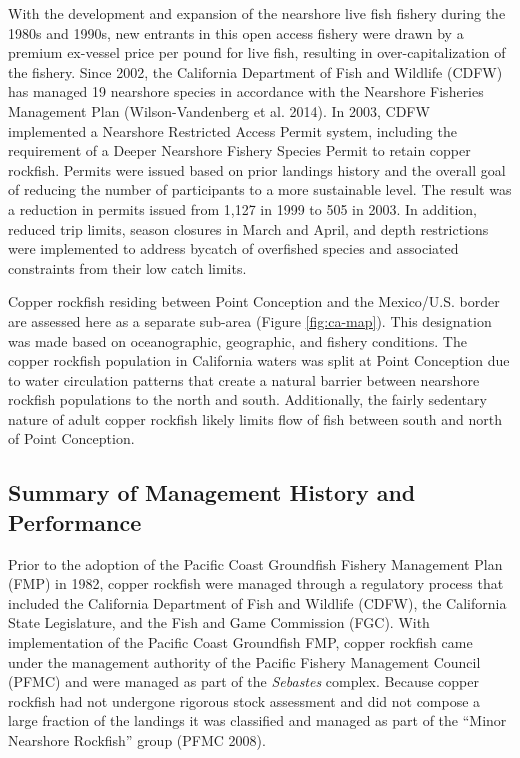 \documentclass[11pt,
  english,
  letterpaper,
]{article}
\begin{document}
With the development and expansion of the nearshore live fish fishery during the 1980s and 1990s, new entrants in this open access fishery were drawn by a premium ex-vessel price per pound for live fish, resulting in over-capitalization of the fishery. Since 2002, the California Department of Fish and Wildlife (CDFW) has managed 19 nearshore species in accordance with the Nearshore Fisheries Management Plan (Wilson-Vandenberg et al. 2014). In 2003, CDFW implemented a Nearshore Restricted Access Permit system, including the requirement of a Deeper Nearshore Fishery Species Permit to retain copper rockfish. Permits were issued based on prior landings history and the overall goal of reducing the number of participants to a more sustainable level. The result was a reduction in permits issued from 1,127 in 1999 to 505 in 2003. In addition, reduced trip limits, season closures in March and April, and depth restrictions were implemented to address bycatch of overfished species and associated constraints from their low catch limits.

Copper rockfish residing between Point Conception and the Mexico/U.S. border are assessed here as a separate sub-area (Figure \ref{fig:ca-map}). This designation was made based on oceanographic, geographic, and fishery conditions. The copper rockfish population in California waters was split at Point Conception due to water circulation patterns that create a natural barrier between nearshore rockfish populations to the north and south. Additionally, the fairly sedentary nature of adult copper rockfish likely limits flow of fish between south and north of Point Conception.

\hypertarget{summary-of-management-history-and-performance}{%
\subsection{Summary of Management History and Performance}\label{summary-of-management-history-and-performance}}

Prior to the adoption of the Pacific Coast Groundfish Fishery Management Plan (FMP) in 1982, copper rockfish were managed through a regulatory process that included the California Department of Fish and Wildlife (CDFW), the California State Legislature, and the Fish and Game Commission (FGC). With implementation of the Pacific Coast Groundfish FMP, copper rockfish came under the management authority of the Pacific Fishery Management Council (PFMC) and were managed as part of the \emph{Sebastes} complex. Because copper rockfish had not undergone rigorous stock assessment and did not compose a large fraction of the landings it was classified and managed as part of the ``Minor Nearshore Rockfish'' group (PFMC 2008).
\end{document}
